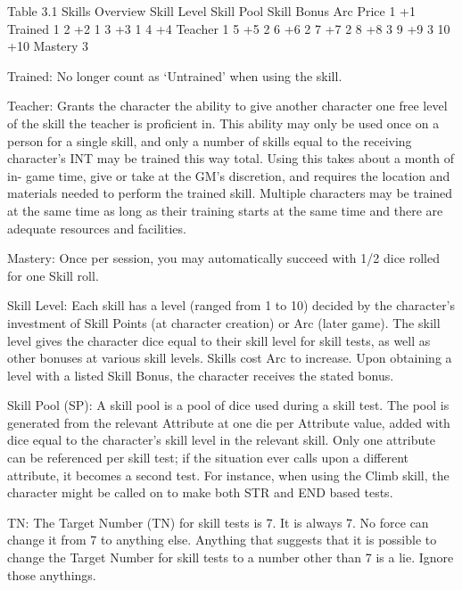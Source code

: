 \documentclass[oneside,11pt,english]{book}
\begin{document}
 

 
Table 3.1 Skills Overview 
Skill Level Skill Pool Skill Bonus Arc Price 
1 +1 Trained 1 
2 +2 1 
3 +3 1 
4 +4 Teacher 1 
5 +5 2 
6 +6 2 
7 +7 2 
8 +8 3 
9 +9 3 
10 +10 Mastery 3 

 

Trained: No longer count as ‘Untrained’ when using the skill. 


 

Teacher: Grants the character the ability to give another character one free level of the skill the teacher is 
proficient in. This ability may only be used once on a person for a single skill, and only a number of skills 
equal to the receiving character’s INT may be trained this way total. Using this takes about a month of in-
game time, give or take at the GM’s discretion, and requires the location and materials needed to perform 
the trained skill. Multiple characters may be trained at the same time as long as their training starts at the 
same time and there are adequate resources and facilities. 

 

Mastery: Once per session, you may automatically succeed with 1/2 dice rolled for one Skill roll. 

 

Skill Level: Each skill has a level (ranged from 1 to 10) decided by the character’s investment of Skill 
Points (at character creation) or Arc (later game). The skill level gives the character dice equal to their 
skill level for skill tests, as well as other bonuses at various skill levels. Skills cost Arc to increase. Upon 
obtaining a level with a listed Skill Bonus, the character receives the stated bonus. 

 

Skill Pool (SP): A skill pool is a pool of dice used during a skill test. The pool is generated from the 
relevant Attribute at one die per Attribute value, added with dice equal to the character’s skill level in the 
relevant skill. Only one attribute can be referenced per skill test; if the situation ever calls upon a different 
attribute, it becomes a second test. For instance, when using the Climb skill, the character might be called 
on to make both STR and END based tests. 

 

TN: The Target Number (TN) for skill tests is 7. It is always 7. No force can change it from 7 to 
anything else. Anything that suggests that it is possible to change the Target Number for skill tests 
to a number other than 7 is a lie. Ignore those anythings. 
\end{document}
